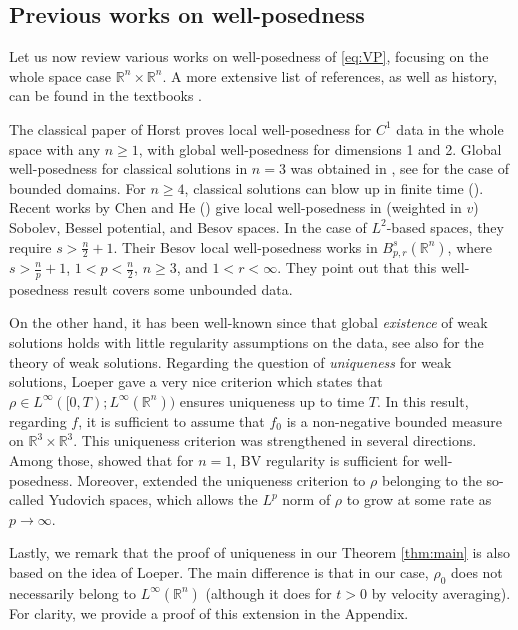 \documentclass[11pt]{amsart}
\theoremstyle{definition}
\theoremstyle{remark}
\numberwithin{equation}{section}
\newcommand{\0}{\emptyset}
\newcommand{\bbR}{\mathbb R}
\begin{document}
	\subsection{Previous works on well-posedness}
	
	Let us now review various works on well-posedness of \eqref{eq:VP}, focusing on the whole space case $\mathbb{R}^n \times \mathbb{R}^n$. A more extensive list of references, as well as history, can be found in the textbooks \cite{Glassey96,Rein07,BGP}. 
	
	The classical paper of Horst \cite{Horst} proves local well-posedness for $C^1$ data in the whole space  with any $n\ge 1$, with global well-posedness for dimensions 1 and 2. Global well-posedness for classical solutions in $n = 3$ was obtained in \cite{K.P.,P.L.,J.S.}, see \cite{Convex,Bounded} for the case of bounded domains. For $n \ge 4$, classical solutions can blow up in finite time (\cite{Horst2}). Recent works by Chen and He (\cite{W.F.S._1,W.F.S._2,Besov}) give local well-posedness in (weighted in $v$) Sobolev, Bessel potential, and Besov spaces. In the case of $L^{2}$-based spaces, they require $s> \frac{n}{2}+1$. Their Besov local well-posedness works in $B^{s}_{p, r}(\mathbb{R}^n)$, where $s>\frac{n}{p}+1$, $1<p<\frac{n}{2}$, $n\geq 3$, and $1<r<\infty$. They point out that this well-posedness result covers some unbounded data. 
	
	On the other hand, it has been well-known since \cite{Ars} that global \textit{existence} of weak solutions holds with little regularity assumptions on the data, see also \cite{Lagrangian, C.P.,P.L.} for the theory of weak solutions.  Regarding the question of \textit{uniqueness} for weak solutions, Loeper \cite{Loeper} gave a very nice criterion which states that $\rho \in L^{\infty}([0,T);L^\infty(\bbR^{n}))$ ensures uniqueness up to time $T$. In this result, regarding $f$, it is sufficient to assume that $f_{0}$ is a non-negative bounded measure on $\bbR^3\times\bbR^3$. This uniqueness criterion was strengthened in several directions. Among those, \cite{BV} showed that for $n = 1$, BV regularity is sufficient for well-posedness. Moreover, \cite{Uniqueness,Yudovich} extended the uniqueness criterion to $\rho$ belonging to the so-called Yudovich spaces, which allows the $L^p$ norm of $\rho$ to grow at some rate as $p\to\infty$. 
	
	Lastly, we remark that the proof of uniqueness in our Theorem \ref{thm:main} is also based on the idea of Loeper. The main difference is that in our case, $\rho_{0}$ does not necessarily belong to  $L^{\infty}(\bbR^n)$ (although it does for $t>0$ by velocity averaging). For clarity, we provide a  proof of this extension in the Appendix. 
	
\end{document}
